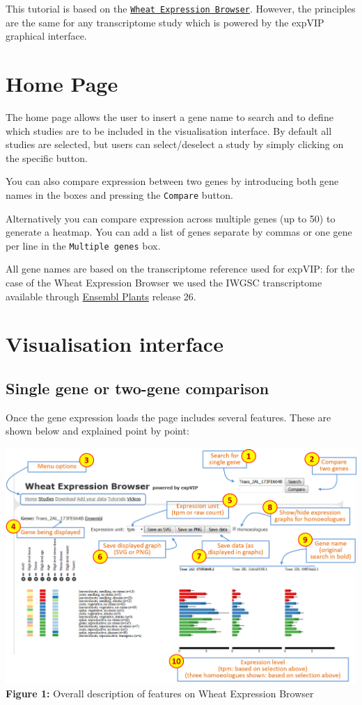 This tutorial is based on the
\href{http://www.wheat-expression.com/}{\lstinline!Wheat Expression Browser!}.
However, the principles are the same for any transcriptome study which
is powered by the expVIP graphical interface.

\section{\textbf{Home Page}}\label{home-page}

The home page allows the user to insert a gene name to search and to
define which studies are to be included in the visualisation interface.
By default all studies are selected, but users can select/deselect a
study by simply clicking on the specific button.

You can also compare expression between two genes by introducing both
gene names in the boxes and pressing the \lstinline!Compare! button.

Alternatively you can compare expression across multiple genes (up to
50) to generate a heatmap. You can add a list of genes separate by
commas or one gene per line in the \lstinline!Multiple genes! box.

All gene names are based on the transcriptome reference used for expVIP:
for the case of the Wheat Expression Browser we used the IWGSC
transcriptome available through
\href{http://plants.ensembl.org/Triticum_aestivum/Info/Annotation/\#genebuild}{Ensembl
Plants} release 26.

\section{\textbf{Visualisation
interface}}\label{visualisation-interface}

\subsection{\textbf{Single gene or two-gene
comparison}}\label{single-gene-or-two-gene-comparison}

Once the gene expression loads the page includes several features. These
are shown below and explained point by point:

\includegraphics{images/Figure1.png} \textbf{Figure 1:} Overall
description of features on Wheat Expression Browser

